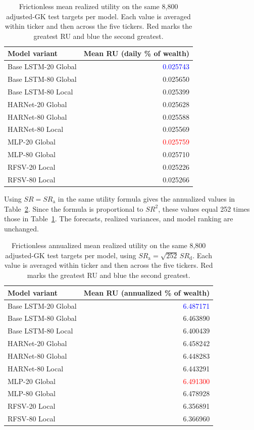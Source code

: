 \documentclass[12pt,a4paper]{article}
\numberwithin{equation}{section}
\numberwithin{table}{section}
\numberwithin{figure}{section}
\begin{document}
\begin{table}[htbp]
\centering
\begin{tabular}{lr}\hline
Model variant & Mean RU (daily \% of wealth)\\\hline
Base LSTM-20 Global & \textcolor{blue}{0.025743}\\
Base LSTM-80 Global & 0.025650\\
Base LSTM-80 Local & 0.025399\\
HARNet-20 Global & 0.025628\\
HARNet-80 Global & 0.025588\\
HARNet-80 Local & 0.025569\\
MLP-20 Global & \textcolor{red}{0.025759}\\
MLP-80 Global & 0.025710\\
RFSV-20 Local & 0.025226\\
RFSV-80 Local & 0.025266\\\hline
\end{tabular}
\caption{Frictionless mean realized utility on the same 8,800 adjusted-GK test targets per model. Each value is averaged within ticker and then across the five tickers. Red marks the greatest RU and blue the second greatest.}
\label{tab:realized-utility}
\end{table}
Using $SR=SR_{\mathrm a}$ in the same utility formula gives the annualized values in Table~\ref{tab:realized-utility-annual}. Since the formula is proportional to $SR^2$, these values equal 252 times those in Table~\ref{tab:realized-utility}. The forecasts, realized variances, and model ranking are unchanged. 

\begin{table}[htbp]
\centering
\begin{tabular}{lr}\hline
Model variant & Mean RU (annualized \% of wealth)\\\hline
Base LSTM-20 Global & \textcolor{blue}{6.487171}\\
Base LSTM-80 Global & 6.463890\\
Base LSTM-80 Local & 6.400439\\
HARNet-20 Global & 6.458242\\
HARNet-80 Global & 6.448283\\
HARNet-80 Local & 6.443291\\
MLP-20 Global & \textcolor{red}{6.491300}\\
MLP-80 Global & 6.478928\\
RFSV-20 Local & 6.356891\\
RFSV-80 Local & 6.366960\\\hline
\end{tabular}
\caption{Frictionless annualized mean realized utility on the same 8,800 adjusted-GK test targets per model, using $SR_{\mathrm a}=\sqrt{252}\,SR_{\mathrm d}$. Each value is averaged within ticker and then across the five tickers. Red marks the greatest RU and blue the second greatest.}
\label{tab:realized-utility-annual}
\end{table}
\FloatBarrier
\end{document}
